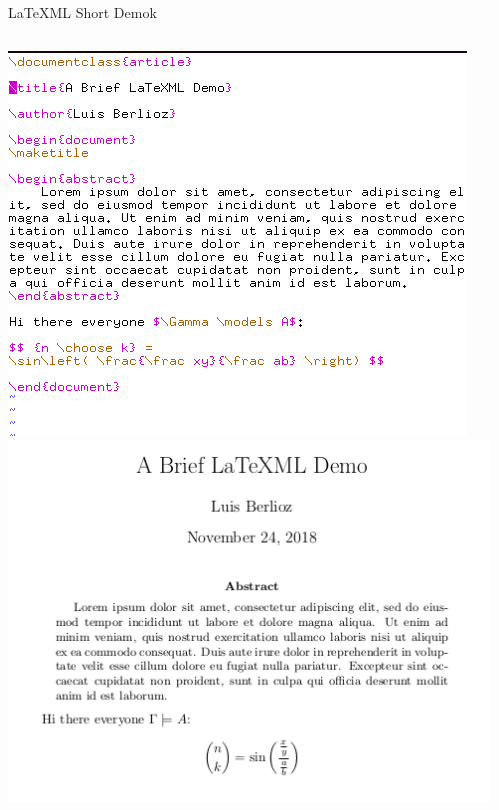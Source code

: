 \documentclass[9pt]{beamer}
\begin{document}
\begin{frame}{LaTeXML Short Demok}
    \begin{columns}[T]
        \begin{column}{0.5\textwidth}
    \includegraphics[width=\textwidth]{ltxml_demo_vim.png}
    \includegraphics[width=\textwidth]{demo_pdf.png}
        \end{column}
        \begin{column}{0.5\textwidth}

\end{column}
\end{columns}
\end{frame}
\end{document}
